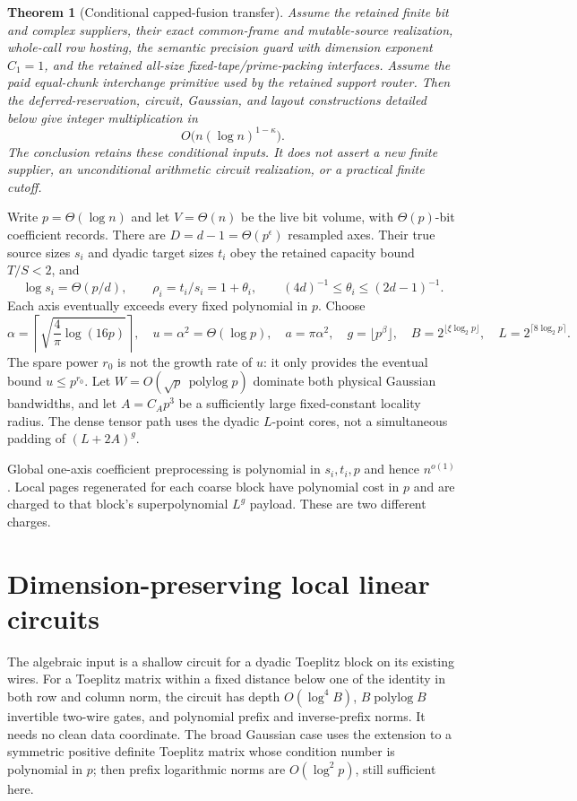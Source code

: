 \documentclass[11pt]{article}
\newtheorem{theorem}{Theorem}
\newcommand{\plog}{\operatorname{polylog}}
\begin{document}
\begin{theorem}[Conditional capped-fusion transfer]\label{thm:main}
Assume the retained finite bit and complex suppliers, their exact common-frame and mutable-source realization, whole-call row hosting, the semantic precision guard with dimension exponent $C_1=1$, and the retained all-size fixed-tape/prime-packing interfaces. Assume the paid equal-chunk interchange primitive used by the retained support router. Then the deferred-reservation, circuit, Gaussian, and layout constructions detailed below give integer multiplication in
\[
 O\bigl(n(\log n)^{1-\kappa}\bigr).
\]
The conclusion retains these conditional inputs. It does not assert a new finite supplier, an unconditional arithmetic circuit realization, or a practical finite cutoff.
\end{theorem}

Write $p=\Theta(\log n)$ and let $V=\Theta(n)$ be the live bit volume, with $\Theta(p)$-bit coefficient records. There are $D=d-1=\Theta(p^\epsilon)$ resampled axes. Their true source sizes $s_i$ and dyadic target sizes $t_i$ obey the retained capacity bound $T/S<2$, and
\[
 \log s_i=\Theta(p/d),\qquad
 \rho_i=t_i/s_i=1+\theta_i,\qquad
 (4d)^{-1}\leq\theta_i\leq(2d-1)^{-1}.
\]
Each axis eventually exceeds every fixed polynomial in $p$. Choose
\[
 \alpha=\left\lceil\sqrt{\frac4\pi\log(16p)}\right\rceil,
 \quad u=\alpha^2=\Theta(\log p),\quad a=\pi\alpha^2,
 \quad g=\lfloor p^\beta\rfloor,
 \quad B=2^{\lfloor\xi\log_2p\rfloor},
 \quad L=2^{\lceil8\log_2p\rceil}.
\]
The spare power $r_0$ is not the growth rate of $u$: it only provides the eventual bound $u\leq p^{r_0}$. Let $W=O(\sqrt p\,\plog p)$ dominate both physical Gaussian bandwidths, and let $A=C_Ap^3$ be a sufficiently large fixed-constant locality radius. The dense tensor path uses the dyadic $L$-point cores, not a simultaneous padding of $(L+2A)^g$.

Global one-axis coefficient preprocessing is polynomial in $s_i,t_i,p$ and hence $n^{o(1)}$. Local pages regenerated for each coarse block have polynomial cost in $p$ and are charged to that block's superpolynomial $L^g$ payload. These are two different charges.

\section{Dimension-preserving local linear circuits}

The algebraic input is a shallow circuit for a dyadic Toeplitz block on its existing wires. For a Toeplitz matrix within a fixed distance below one of the identity in both row and column norm, the circuit has depth $O(\log^4 B)$, $B\plog B$ invertible two-wire gates, and polynomial prefix and inverse-prefix norms. It needs no clean data coordinate. The broad Gaussian case uses the extension to a symmetric positive definite Toeplitz matrix whose condition number is polynomial in $p$; then prefix logarithmic norms are $O(\log^2p)$, still sufficient here.
\end{document}
